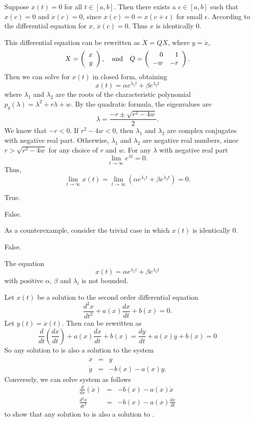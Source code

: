 Suppose $x(t) = 0$ for all $t \in [a,b]$.  Then there exists a 
$c \in [a,b]$ such that $x(c) = 0$ and $\dot{x}(c) = 0$, since $x(c) =
0 = x(c + \epsilon)$ for small $\epsilon$.  According to the differential
equation for $x$, $\ddot{x}(c) = 0$.  Thus $x$ is identically $0$.

This differential equation can be rewritten as $\dot{X} = QX$, where
$y = \dot{x}$,
\[
X = \left(\begin{array}{r} x \\ y\end{array}\right), \quad\mbox{and}\quad Q = \left(\begin{array}{rr} 0 & 1\\ -w &-r\end{array}\right).
\]
Then we can solve for $x(t)$ in closed form, obtaining
\[
x(t) = \alpha e^{\lambda_1 t} + \beta e^{\lambda_2 t}
\]
where $\lambda_1$ and $\lambda_2$ are the roots of the characteristic
polynomial $p_q(\lambda) = \lambda^2 + r\lambda + w$.  By the quadratic
formula, the eigenvalues are
\[
\lambda = \frac{-r \pm \sqrt{r^2 - 4w}}{2}.
\]
We know that $-r < 0$.  If $r^2 - 4w < 0$, then $\lambda_1$ and $\lambda_2$
are complex conjugates with negative real part.  Otherwise, $\lambda_1$
and $\lambda_2$ are negative real numbers, since $r > \sqrt{r^2 - 4w}$
for any choice of $r$ and $w$.  For any $\lambda$ with negative real part
\[
\lim_{t \rightarrow \infty} e^{\lambda t} = 0.
\]
Thus,
\[
\lim_{t \rightarrow \infty} x(t) =
\lim_{t \rightarrow \infty} (\alpha e^{\lambda_1 t} +
\beta e^{\lambda_2 t}) = 0.
\]

\newpage
{} True.

 \ans False.

\soln As a counterexample, consider the trivial case in which $x(t)$
is identically $0$.

 \ans False.

\soln The equation
\[
x(t) = \alpha e^{\lambda_1 t} + \beta e^{\lambda_2 t}
\]
with positive $\alpha$, $\beta$ and $\lambda_i$ is not bounded.

Let $x(t)$ be a solution to the second order differential equation
\begin{equation} \label{order2}
\frac{d^2x}{dt^2} + a(x)\frac{dx}{dt} + b(x) = 0.
\end{equation}
Let $y(t) = \dot x(t)$.  Then  can be rewritten as
\[ \frac{d}{dt}\left(\frac{dx}{dt}\right) + a(x)\frac{dx}{dt}
+ b(x) = \frac{dy}{dt} + a(x)y + b(x) = 0 \]
So any solution to  is also a solution to the system
\begin{equation} \label{order2sol}
\begin{array}{rcl}
\dot{x} & = & y \\
\dot{y} & = & -b(x) - a(x) y.\end{array}
\end{equation}
Conversely, we can solve system  as follows
\[ \begin{array}{rcl}
\frac{d}{dx}\left(\dot{x}\right) & = & -b(x) - a(x)\dot{x} \\
\frac{d^2x}{dt^2} & = & -b(x) - a(x)\frac{dx}{dt}\end{array}
\]
to show that any solution to  is also a solution
to .

